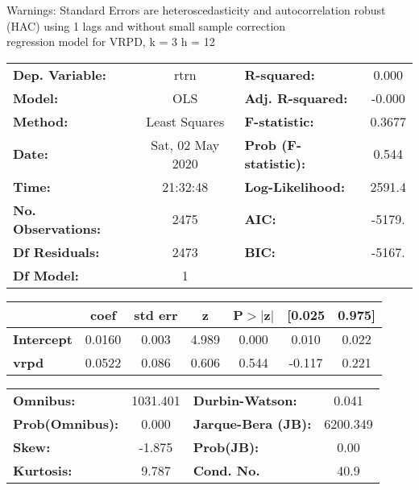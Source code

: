 Warnings: \newline
 [1] Standard Errors are heteroscedasticity and autocorrelation robust (HAC) using 1 lags and without small sample correction\\ 

regression model for VRPD, k = 3 h = 12\begin{center}
\begin{tabular}{lclc}
\toprule
\textbf{Dep. Variable:}    &       rtrn       & \textbf{  R-squared:         } &     0.000   \\
\textbf{Model:}            &       OLS        & \textbf{  Adj. R-squared:    } &    -0.000   \\
\textbf{Method:}           &  Least Squares   & \textbf{  F-statistic:       } &    0.3677   \\
\textbf{Date:}             & Sat, 02 May 2020 & \textbf{  Prob (F-statistic):} &    0.544    \\
\textbf{Time:}             &     21:32:48     & \textbf{  Log-Likelihood:    } &    2591.4   \\
\textbf{No. Observations:} &        2475      & \textbf{  AIC:               } &    -5179.   \\
\textbf{Df Residuals:}     &        2473      & \textbf{  BIC:               } &    -5167.   \\
\textbf{Df Model:}         &           1      & \textbf{                     } &             \\
\bottomrule
\end{tabular}
\begin{tabular}{lcccccc}
                   & \textbf{coef} & \textbf{std err} & \textbf{z} & \textbf{P$> |$z$|$} & \textbf{[0.025} & \textbf{0.975]}  \\
\midrule
\textbf{Intercept} &       0.0160  &        0.003     &     4.989  &         0.000        &        0.010    &        0.022     \\
\textbf{vrpd}      &       0.0522  &        0.086     &     0.606  &         0.544        &       -0.117    &        0.221     \\
\bottomrule
\end{tabular}
\begin{tabular}{lclc}
\textbf{Omnibus:}       & 1031.401 & \textbf{  Durbin-Watson:     } &    0.041  \\
\textbf{Prob(Omnibus):} &   0.000  & \textbf{  Jarque-Bera (JB):  } & 6200.349  \\
\textbf{Skew:}          &  -1.875  & \textbf{  Prob(JB):          } &     0.00  \\
\textbf{Kurtosis:}      &   9.787  & \textbf{  Cond. No.          } &     40.9  \\
\bottomrule
\end{tabular}
\end{center}

